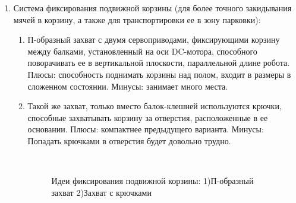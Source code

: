 \begin{enumerate}
\begin{enumerate}
\begin{enumerate}
\begin{enumerate}
	    \end{enumerate}
	    
	    \item Система фиксирования подвижной корзины (для более точного закидывания мячей в корзину, а также для транспортировки ее в зону парковки):\newline
	    \begin{enumerate}
	      \item П-образный захват с двумя сервоприводами, фиксирующими корзину между балками, установленный на оси DC-мотора, способного поворачивать ее в вертикальной плоскости, параллельной длине робота. Плюсы: способность поднимать корзины над полом, входит в размеры в сложенном состоянии. Минусы: занимает много места.\newline
	      
          \item Такой же захват, только вместо балок-клешней используются крючки, способные захватывать корзину за отверстия, расположенные в ее основании. Плюсы: компактнее предыдущего варианта. Минусы: Попадать крючками в отверстия будет довольно трудно.\newline
          
          \begin{figure}[H]
          	\begin{minipage}[h]{0.2\linewidth}
          		\center  
          	\end{minipage}
          	\begin{minipage}[h]{0.6\linewidth}
          		\caption{Идеи фиксирования подвижной корзины: 1)П-образный захват 2)Захват с крючками}
          	\end{minipage}
          \end{figure}
          

\end{enumerate}
\end{enumerate}
\end{enumerate}
\end{enumerate}
